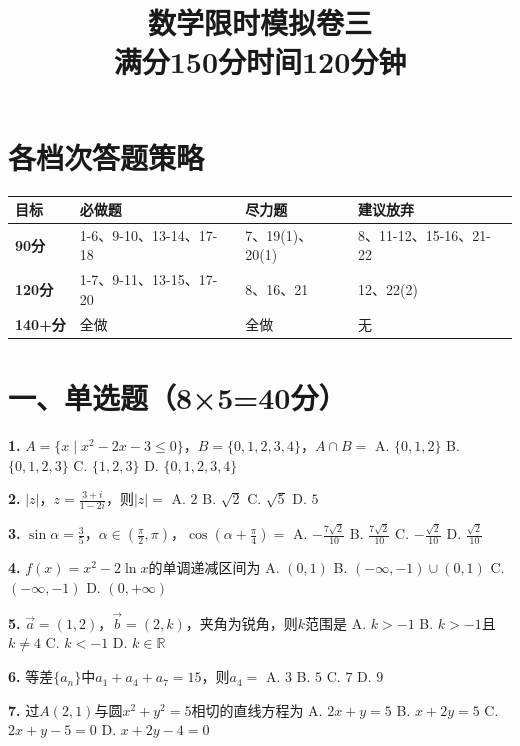 \documentclass[12pt,a4paper]{ctexart}
\title{\textbf{数学限时模拟卷三}\\[5pt]\large 满分150分\quad 时间120分钟}
\date{}
\begin{document}
\maketitle

\section*{各档次答题策略}
\begin{center}
\begin{tabular}{p{2.5cm}|p{4cm}|p{4cm}|p{4cm}}
\textbf{目标} & \textbf{必做题} & \textbf{尽力题} & \textbf{建议放弃} \\ \hline
\textbf{90分} & 1-6、9-10、13-14、17-18 & 7、19(1)、20(1) & 8、11-12、15-16、21-22 \\ \hline
\textbf{120分} & 1-7、9-11、13-15、17-20 & 8、16、21 & 12、22(2) \\ \hline
\textbf{140+分} & 全做 & 全做 & 无 \\
\end{tabular}
\end{center}

\section*{一、单选题（8×5=40分）}

\textbf{1.} $A=\{x\mid x^2-2x-3\le0\}$，$B=\{0,1,2,3,4\}$，$A\cap B=$
A. $\{0,1,2\}$ \quad B. $\{0,1,2,3\}$ \quad C. $\{1,2,3\}$ \quad D. $\{0,1,2,3,4\}$

\textbf{2.} $|z|$，$z=\frac{3+i}{1-2i}$，则$|z|=$
A. $2$ \quad B. $\sqrt2$ \quad C. $\sqrt5$ \quad D. $5$

\textbf{3.} $\sin\alpha=\frac35$，$\alpha\in(\frac{\pi}{2},\pi)$，$\cos(\alpha+\frac{\pi}{4})=$
A. $-\frac{7\sqrt2}{10}$ \quad B. $\frac{7\sqrt2}{10}$ \quad C. $-\frac{\sqrt2}{10}$ \quad D. $\frac{\sqrt2}{10}$

\textbf{4.} $f(x)=x^2-2\ln x$的单调递减区间为
A. $(0,1)$ \quad B. $(-\infty,-1)\cup(0,1)$ \quad C. $(-\infty,-1)$ \quad D. $(0,+\infty)$

\textbf{5.} $\vec{a}=(1,2)$，$\vec{b}=(2,k)$，夹角为锐角，则$k$范围是
A. $k>-1$ \quad B. $k>-1$且$k\neq4$ \quad C. $k<-1$ \quad D. $k\in\mathbb{R}$

\textbf{6.} 等差$\{a_n\}$中$a_1+a_4+a_7=15$，则$a_4=$
A. $3$ \quad B. $5$ \quad C. $7$ \quad D. $9$

\textbf{7.} 过$A(2,1)$与圆$x^2+y^2=5$相切的直线方程为
A. $2x+y=5$ \quad B. $x+2y=5$ \quad C. $2x+y-5=0$ \quad D. $x+2y-4=0$
\end{document}
